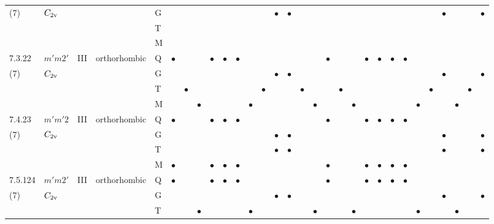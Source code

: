 \documentclass[fleqn,9pt,landscape]{jsarticle}
\begin{document}
\begin{longtable}{lllll|l|lll|ll|lll|l|lll|lll|l|ll|lll|lll}
(7) & $C_{\rm 2v}$ &  &  & G &  &  &  &  &  &  &  &  & $\bullet$ & $\bullet$ &  &  &  &  &  &  &  &  &  &  &  & $\bullet$ &  &  & $\bullet$ \\
 &  &  &  & T &  &  &  &  &  &  &  &  &  &  &  &  &  &  &  &  &  &  &  &  &  &  &  &  &  \\
 &  &  &  & M &  &  &  &  &  &  &  &  &  &  &  &  &  &  &  &  &  &  &  &  &  &  &  &  &  \\ \hline
7.3.22 & \texttt{$m'm2'$} & III & orthorhombic & Q & $\bullet$ &  &  & $\bullet$ & $\bullet$ & $\bullet$ &  &  &  &  &  &  & $\bullet$ &  &  & $\bullet$ & $\bullet$ & $\bullet$ & $\bullet$ &  &  &  &  &  &  \\
(7) & $C_{\rm 2v}$ &  &  & G &  &  &  &  &  &  &  &  & $\bullet$ & $\bullet$ &  &  &  &  &  &  &  &  &  &  &  & $\bullet$ &  &  & $\bullet$ \\
 &  &  &  & T &  & $\bullet$ &  &  &  &  &  & $\bullet$ &  &  & $\bullet$ &  &  & $\bullet$ &  &  &  &  &  &  & $\bullet$ &  &  & $\bullet$ &  \\
 &  &  &  & M &  &  & $\bullet$ &  &  &  & $\bullet$ &  &  &  &  & $\bullet$ &  &  & $\bullet$ &  &  &  &  & $\bullet$ &  &  & $\bullet$ &  &  \\ \hline
7.4.23 & \texttt{$m'm'2$} & III & orthorhombic & Q & $\bullet$ &  &  & $\bullet$ & $\bullet$ & $\bullet$ &  &  &  &  &  &  & $\bullet$ &  &  & $\bullet$ & $\bullet$ & $\bullet$ & $\bullet$ &  &  &  &  &  &  \\
(7) & $C_{\rm 2v}$ &  &  & G &  &  &  &  &  &  &  &  & $\bullet$ & $\bullet$ &  &  &  &  &  &  &  &  &  &  &  & $\bullet$ &  &  & $\bullet$ \\
 &  &  &  & T &  &  &  &  &  &  &  &  & $\bullet$ & $\bullet$ &  &  &  &  &  &  &  &  &  &  &  & $\bullet$ &  &  & $\bullet$ \\
 &  &  &  & M & $\bullet$ &  &  & $\bullet$ & $\bullet$ & $\bullet$ &  &  &  &  &  &  & $\bullet$ &  &  & $\bullet$ & $\bullet$ & $\bullet$ & $\bullet$ &  &  &  &  &  &  \\ \hline
7.5.124 & \texttt{$m'm2'$} & III & orthorhombic & Q & $\bullet$ &  &  & $\bullet$ & $\bullet$ & $\bullet$ &  &  &  &  &  &  & $\bullet$ &  &  & $\bullet$ & $\bullet$ & $\bullet$ & $\bullet$ &  &  &  &  &  &  \\
(7) & $C_{\rm 2v}$ &  &  & G &  &  &  &  &  &  &  &  & $\bullet$ & $\bullet$ &  &  &  &  &  &  &  &  &  &  &  & $\bullet$ &  &  & $\bullet$ \\
 &  &  &  & T &  &  & $\bullet$ &  &  &  & $\bullet$ &  &  &  &  & $\bullet$ &  &  & $\bullet$ &  &  &  &  & $\bullet$ &  &  & $\bullet$ &  &  \\

\end{longtable}
\end{document}
